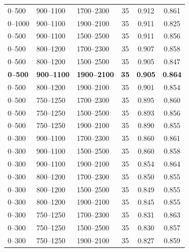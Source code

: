 \documentclass[11pt]{article}
\begin{document}
\begin{table}[H]
\begin{tabular}{lllccc}
0--500 & 900--1100 & 1700--2300 & 35 & 0.912 & 0.861 \\
0--1000 & 900--1100 & 1900--2100 & 35 & 0.911 & 0.825 \\
0--500 & 900--1100 & 1500--2500 & 35 & 0.911 & 0.856 \\
0--500 & 800--1200 & 1700--2300 & 35 & 0.907 & 0.858 \\
0--500 & 800--1200 & 1500--2500 & 35 & 0.905 & 0.847 \\
\textbf{0--500} & \textbf{900--1100} & \textbf{1900--2100} & \textbf{35} & \textbf{0.905} & \textbf{0.864} \\
0--500 & 800--1200 & 1900--2100 & 35 & 0.901 & 0.854 \\
0--500 & 750--1250 & 1700--2300 & 35 & 0.895 & 0.860 \\
0--500 & 750--1250 & 1500--2500 & 35 & 0.893 & 0.856 \\
0--500 & 750--1250 & 1900--2100 & 35 & 0.890 & 0.855 \\
0--300 & 900--1100 & 1700--2300 & 35 & 0.860 & 0.861 \\
0--300 & 900--1100 & 1500--2500 & 35 & 0.860 & 0.858 \\
0--300 & 900--1100 & 1900--2100 & 35 & 0.854 & 0.864 \\
0--300 & 800--1200 & 1700--2300 & 35 & 0.850 & 0.855 \\
0--300 & 800--1200 & 1500--2500 & 35 & 0.849 & 0.855 \\
0--300 & 800--1200 & 1900--2100 & 35 & 0.845 & 0.855 \\
0--300 & 750--1250 & 1700--2300 & 35 & 0.831 & 0.863 \\
0--300 & 750--1250 & 1500--2500 & 35 & 0.830 & 0.857 \\
0--300 & 750--1250 & 1900--2100 & 35 & 0.827 & 0.859 \\
\bottomrule
\end{tabular}
\end{table}
\end{document}
